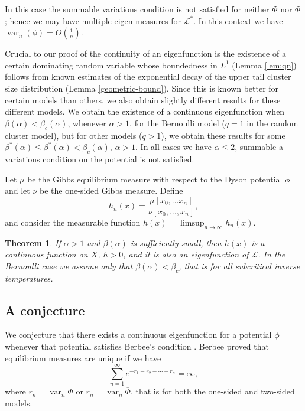 \documentclass[11pt, a4paper]{amsart}
\newtheorem{thm}{Theorem}
\theoremstyle{definition}
\theoremstyle{remark}
\providecommand{\mc}{\mathcal}
\providecommand{\opn}{\operatorname}
\providecommand{\ol}{\overline}
\providecommand{\var}{\opn{var}}
\def\X{X}
\begin{document}
In this case the summable variations condition is not satisfied for neither
$\ol\Phi$ nor $\Phi$; hence we may have multiple eigen-measures for $\mc{L}^*$. In
this context we have $\var_n(\phi)=O(\frac{1}{n})$.

Crucial to our proof of the continuity of an eigenfunction is the existence of a
certain dominating random variable whose boundedness in $L^1$ (Lemma
\ref{lem:qn}) follows from known estimates of the exponential decay of the upper
tail cluster size distribution (Lemma \ref{geometric-bound}). Since this is
known better for certain models than others, we also obtain slightly different
results for these different models. We obtain the existence of a continuous
eigenfunction when $\beta(\alpha)<\beta_c(\alpha)$, whenever $\alpha>1$, for the Bernoulli model ($q=1$
in the random cluster model), but for other models ($q>1$), we obtain these
results for some $\beta^*(\alpha) \leq \beta^*(\alpha) <\beta_c (\alpha)$, $\alpha>1$. In all cases we have $\alpha\leq 2$,
summable a variations condition on the potential is not satisfied.

Let $\mu$ be the Gibbs equilibrium measure with respect
to the Dyson potential $\phi$ and let $\nu$ be the one-sided Gibbs measure.
Define
$$
h_n(x)=\frac{\mu[x_0,\ldots x_n]}{\nu[x_0,\ldots, x_n]},
$$
and consider the measurable function $h(x)=\limsup_{n\to \infty}h_n(x)$. 

\begin{thm}\label{main} 
  If $\alpha>1$ and $\beta(\alpha)$ is sufficiently small, then $h(x)$ is a continuous
  function on $\X$, $h>0$, and it is also an eigenfunction of $\mc{L}$. In the
  Bernoulli case we assume only that $\beta(\alpha)<\beta_c$, that is for all subcritical
  inverse temperatures.
\end{thm}

\subsection{A conjecture}
We conjecture that there exists a continuous eigenfunction for a potential $\phi$
whenever that potential satisfies Berbee's condition \cite{berbee89}. Berbee
proved that equilibrium measures are unique if we have
\begin{equation}\label{berbee}
  \sum_{n=1}^\infty e^{-r_1-r_2-\cdots-r_n}=\infty,
\end{equation}
where $r_n=\var_n \Phi$ or $r_n=\var_n \ol\Phi$, that is for both the one-sided and two-sided models.
\end{document}
